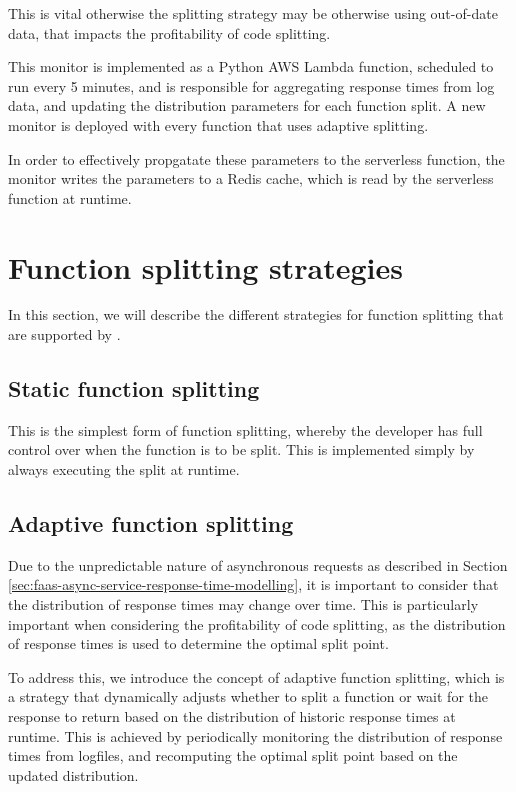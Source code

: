 This is vital otherwise the splitting strategy may be otherwise using out-of-date data, that impacts the profitability of code splitting.

This monitor is implemented as a Python AWS Lambda function, scheduled to run every 5 minutes, and is responsible for aggregating response times from log data, and updating the distribution parameters for each function split. A new monitor is deployed with every function that uses adaptive splitting.

In order to effectively propgatate these parameters to the serverless function, the monitor writes the parameters to a Redis cache, which is read by the serverless function at runtime.

\section{Function splitting strategies}
In this section, we will describe the different strategies for function splitting that are supported by \faaas{}.

\subsection{Static function splitting}
This is the simplest form of function splitting, whereby the developer has full control over when the function is to be split. This is implemented simply by always executing the split at runtime.

\subsection{Adaptive function splitting}
Due to the unpredictable nature of asynchronous requests as described in Section \ref{sec:faas-async-service-response-time-modelling}, it is important to consider that the distribution of response times may change over time. This is particularly important when considering the profitability of code splitting, as the distribution of response times is used to determine the optimal split point.

To address this, we introduce the concept of adaptive function splitting, which is a strategy that dynamically adjusts whether to split a function or wait for the response to return based on the distribution of historic response times at runtime. This is achieved by periodically monitoring the distribution of response times from logfiles, and recomputing the optimal split point based on the updated distribution.

